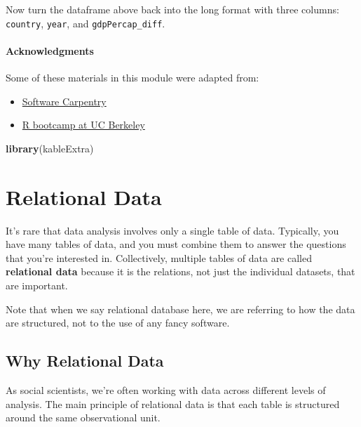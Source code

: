 \documentclass[]{book}
\newenvironment{Shaded}{\begin{snugshade}}{\end{snugshade}}
\newcommand{\KeywordTok}[1]{\textcolor[rgb]{0.13,0.29,0.53}{\textbf{#1}}}
\newcommand{\NormalTok}[1]{#1}
\providecommand{\tightlist}{%
  \setlength{\itemsep}{0pt}\setlength{\parskip}{0pt}}
\begin{document}
Now turn the dataframe above back into the long format with three
columns: \texttt{country}, \texttt{year}, and \texttt{gdpPercap\_diff}.

\subsubsection*{Acknowledgments}\label{acknowledgments-4}

Some of these materials in this module were adapted from:

\begin{itemize}
\tightlist
\item
  \href{http://swcarpentry.github.io/r-novice-gapminder/}{Software
  Carpentry}
\item
  \href{https://github.com/berkeley-scf/r-bootcamp-fall-2019}{R bootcamp
  at UC Berkeley}
\end{itemize}

\begin{Shaded}
\begin{Highlighting}[]
\KeywordTok{library}\NormalTok{(kableExtra)}
\end{Highlighting}
\end{Shaded}

\chapter{Relational Data}\label{relational-data}

It's rare that data analysis involves only a single table of data.
Typically, you have many tables of data, and you must combine them to
answer the questions that you're interested in. Collectively, multiple
tables of data are called \textbf{relational data} because it is the
relations, not just the individual datasets, that are important.

Note that when we say relational database here, we are referring to how
the data are structured, not to the use of any fancy software.

\section{Why Relational Data}\label{why-relational-data}

As social scientists, we're often working with data across different
levels of analysis. The main principle of relational data is that each
table is structured around the same observational unit.
\end{document}
